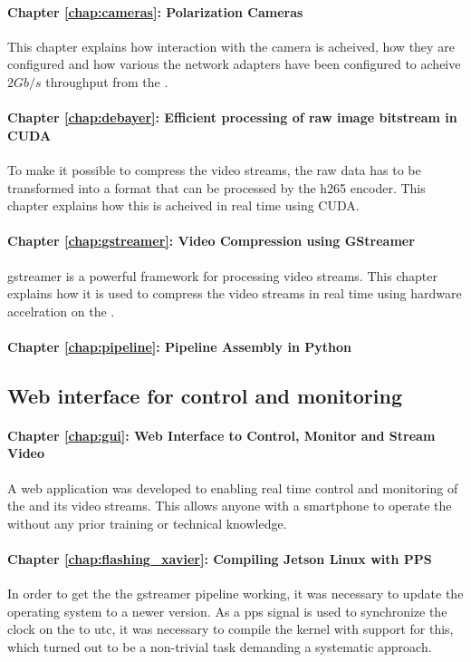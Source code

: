 \paragraph{Chapter \ref{chap:cameras}: Polarization Cameras}
This chapter explains how interaction with the camera is acheived, how they are configured and how various the network adapters have been configured to acheive $2Gb/s$ throughput from the \cams.

\paragraph{Chapter \ref{chap:debayer}: Efficient processing of raw image bitstream in CUDA}
To make it possible to compress the video streams, the raw data has to be transformed into a format that can be processed by the \gls{h265} encoder.
This chapter explains how this is acheived in real time using CUDA.

\paragraph{Chapter \ref{chap:gstreamer}: Video Compression using GStreamer}
\gls{gstreamer} is a powerful framework for processing video streams.
This chapter explains how it is used to compress the video streams in real time using hardware accelration on the \jx.

\paragraph{Chapter \ref{chap:pipeline}: Pipeline Assembly in Python}
\todo

\subsection{Web interface for control and monitoring}

\paragraph{Chapter \ref{chap:gui}: Web Interface to Control, Monitor and Stream Video}
A web application was developed to enabling real time control and monitoring of the \sr and its video streams.
This allows anyone with a smartphone to operate the \sr without any prior training or technical knowledge.


\paragraph{Chapter \ref{chap:flashing_xavier}: Compiling Jetson Linux with PPS}
In order to get the the \gls{gstreamer} pipeline working, it was necessary to update the operating system to a newer version.
As a \gls{pps} signal is used to synchronize the clock on the \jx to \gls{utc}, it was necessary to compile the kernel with support for this, which turned out to be a non-trivial task demanding a systematic approach.

